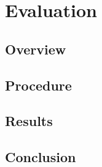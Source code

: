 \chapter{Evaluation}

\section{Overview}

\section{Procedure}

\section{Results}

\section{Conclusion}